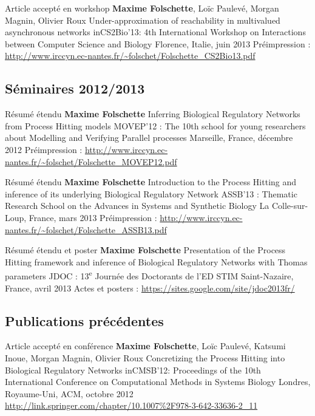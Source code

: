 \publi
{Article accepté en workshop \rev}{\cite{FPMR13-CS3Bio}}
{\textbf{Maxime Folschette}, Loïc Paulevé, Morgan Magnin, Olivier Roux}
{Under-approximation of reachability in multivalued asynchronous networks}
{in}{CS2Bio’13: 4th International Workshop on Interactions between Computer Science and Biology}
{Florence, Italie, juin 2013}
{Préimpression : \url{http://www.irccyn.ec-nantes.fr/~folschet/Folschette_CS2Bio13.pdf}}



\subsection{Séminaires 2012/2013}

\publi
{Résumé étendu \rev}{}
{\textbf{Maxime Folschette}}
{Inferring Biological Regulatory Networks from Process Hitting models}
{}{MOVEP'12 : The 10th school for young researchers about Modelling and Verifying Parallel processes}
{Marseille, France, décembre 2012}
{Préimpression : \url{http://www.irccyn.ec-nantes.fr/~folschet/Folschette_MOVEP12.pdf}}

\publi
{Résumé étendu \rev}{}
{\textbf{Maxime Folschette}}
{Introduction to the Process Hitting and inference of its underlying Biological Regulatory Network}
{}{ASSB'13 : Thematic Research School on the Advances in Systems and Synthetic Biology}
{La Colle-sur-Loup, France, mars 2013}
{Préimpression : \url{http://www.irccyn.ec-nantes.fr/~folschet/Folschette_ASSB13.pdf}}

\publi
{Résumé étendu et poster}{}
{\textbf{Maxime Folschette}}
{Presentation of the Process Hitting framework and inference of Biological Regulatory Networks with Thomas parameters}
{}{JDOC : 13\textsuperscript{e} Journée des Doctorants de l'ED STIM}
{Saint-Nazaire, France, avril 2013}
{Actes et posters : \url{https://sites.google.com/site/jdoc2013fr/}}



\subsection{Publications précédentes}\label{ssec:publications}

\publi
{Article accepté en conférence \rev}{\cite{FPIMR12-CMSB}}
{\textbf{Maxime Folschette}, Loïc Paulevé, Katsumi Inoue, Morgan Magnin, Olivier Roux}
{Concretizing the Process Hitting into Biological Regulatory Networks}
{in}{CMSB'12: Proceedings of the 10th International Conference on Computational Methods in Systems Biology}
{Londres, Royaume-Uni, ACM, octobre 2012}
{\url{http://link.springer.com/chapter/10.1007\%2F978-3-642-33636-2_11}}


